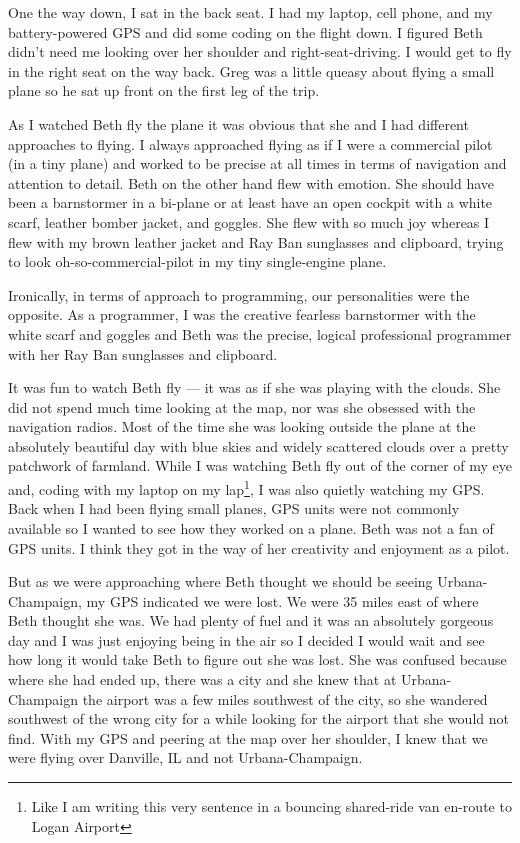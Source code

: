 \documentclass[12pt]{book}
\begin{document}
One the way down, I sat in the back seat.  I had my laptop, cell phone,
and my battery-powered GPS and did some coding on the flight down. I figured
Beth didn't need me looking over her shoulder and right-seat-driving.
I would get to fly in the right seat on the way back.   Greg was a little queasy
about flying a small plane so he sat up front on the first
leg of the trip.

As I watched Beth fly the plane it was obvious that she and I had
different approaches to flying.  I always approached flying
as if I were a commercial pilot (in a tiny plane) and worked to be
precise at all times in terms of navigation and attention
to detail.  Beth on the other hand flew with emotion.  She should have
been a barnstormer in a bi-plane or at least have an open cockpit with
a white scarf, leather bomber jacket, and goggles.  She flew with so much joy
whereas I flew with my brown leather jacket and Ray Ban sunglasses
and clipboard, trying to look oh-so-commercial-pilot in my tiny
single-engine plane.

Ironically, in terms of approach to programming, our personalities
were the opposite.
As a programmer, I was the creative fearless barnstormer with
the white scarf and goggles and Beth was the precise, logical
professional programmer
with her Ray Ban sunglasses and clipboard.

It was fun to watch Beth fly --- it was as if she was playing with the clouds.
She did not spend much time looking at the map, nor was she obsessed
with the navigation radios.  Most of the time she was looking outside
the plane at the absolutely beautiful day with blue skies and widely
scattered clouds over a pretty patchwork of farmland.   While I was
watching Beth fly out of the corner of my eye and, coding with my laptop
on my lap\footnote{Like I am writing this very sentence in a bouncing
shared-ride van en-route to Logan Airport}, I was also quietly watching
my GPS.  Back when I had been flying small planes,
GPS units were not commonly available so I wanted to see how they worked on a plane.
Beth was not a fan of GPS units. I think they got in the way of
her creativity and enjoyment as a pilot.

But as we were approaching where Beth thought we should be seeing
Urbana-Champaign, my GPS indicated we were lost.  We were 35 miles
east of where Beth thought she was.  We had plenty of fuel
and it was an absolutely gorgeous day and I was just enjoying
being in the air so I decided I would wait and see how long it
would take Beth to figure out she was
lost.  She was confused because where she had ended up, there was a city
and she knew that at Urbana-Champaign the airport was a few miles
southwest of the city, so she wandered southwest of the wrong city
for a while looking for the airport that she would not find.  With
my GPS and peering at the map over her shoulder, I knew that
we were flying over Danville, IL and not Urbana-Champaign.
\end{document}
